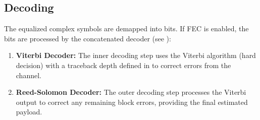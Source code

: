 \subsection{Decoding}%
\label{sub:Decoding}

The equalized complex symbols are demapped into bits. If \textsf{FEC} is enabled, the bits are processed by the concatenated decoder (see ):
\begin{enumerate}
    \item \textbf{Viterbi Decoder:} The inner decoding step uses the Viterbi algorithm (hard decision) with a traceback depth defined in  to correct errors from the channel.
    \item \textbf{Reed-Solomon Decoder:} The outer decoding step processes the Viterbi output to correct any remaining block errors, providing the final estimated payload.
\end{enumerate}


\newpage
